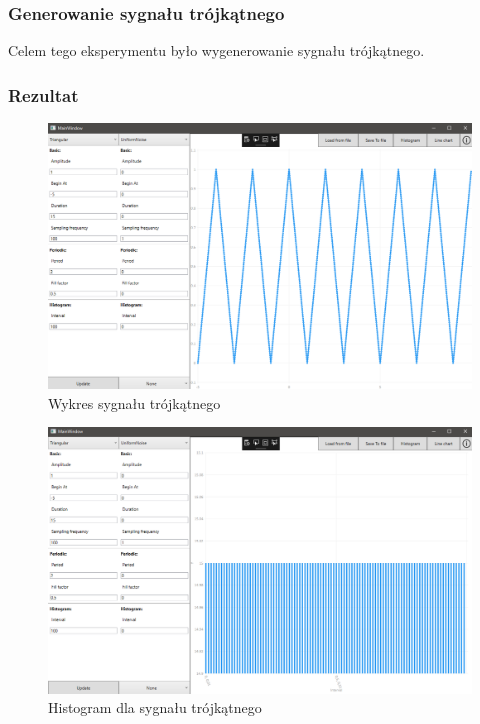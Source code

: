 \documentclass[12pt]{article}
\begin{document}
\subsubsection{Generowanie sygnału trójkątnego}
Celem tego eksperymentu było wygenerowanie sygnału trójkątnego.


\subsubsection{Rezultat}

\begin{figure}[H]
 \centering
 \includegraphics[width=14cm]{images/trian1.PNG}
 \vspace{-0.3cm}
 \caption{Wykres sygnału trójkątnego}
 \label{gui}
\end{figure}

\begin{figure}[H]
 \centering
 \includegraphics[width=14cm]{images/trian1hist.PNG}
 \vspace{-0.3cm}
 \caption{Histogram dla sygnału trójkątnego}
 \label{gui}
\end{figure}
\end{document}
